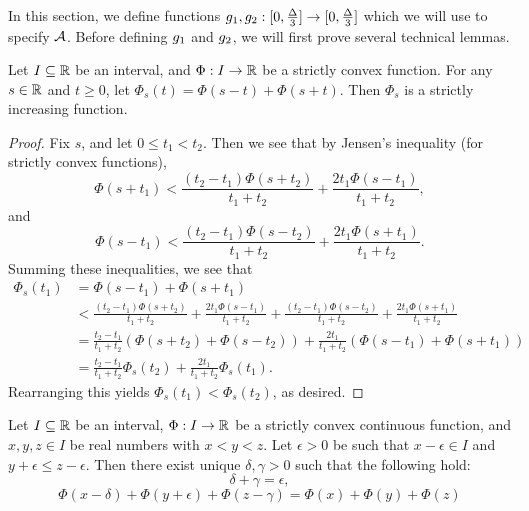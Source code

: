 In this section, we define functions $g_1, g_2: [0, \frac{\Delta}{3}] \to [0, \frac{\Delta}{3}]$ which we will use to specify $\mathcal{A}$. Before defining $g_1$ and $g_2$, we will first prove several technical lemmas.

\begin{lem}\label{lem:phi_s}
Let $I \subseteq \mathbb R$ be an interval, and $\Phi:I \to \mathbb R$ be a strictly convex function.  For any $s \in \mathbb R$ and $t \geq 0$, let $\Phi_s(t) = \Phi(s-t) + \Phi(s + t)$. Then $\Phi_s$ is a strictly increasing function.
\end{lem}

\begin{proof}
Fix $s$, and let $0 \leq t_1 < t_2$. Then we see that by Jensen's inequality (for strictly convex functions), $$\Phi(s + t_1) < \frac{(t_2-t_1)\Phi(s+t_2)}{t_1 + t_2} + \frac{2t_1\Phi(s-t_1)}{t_1 + t_2},$$ and $$\Phi(s - t_1) < \frac{(t_2-t_1)\Phi(s-t_2)}{t_1 + t_2} + \frac{2t_1\Phi(s+t_1)}{t_1 + t_2}.$$ Summing these inequalities, we see that 
\begin{equation*}
\begin{split}
\Phi_s(t_1) &= \Phi(s - t_1) + \Phi(s + t_1) \\
&< \frac{(t_2-t_1)\Phi(s+t_2)}{t_1 + t_2} + \frac{2t_1\Phi(s-t_1)}{t_1 + t_2} + \frac{(t_2-t_1)\Phi(s-t_2)}{t_1 + t_2} + \frac{2t_1\Phi(s+t_1)}{t_1 + t_2} \\
&= \frac{t_2 - t_1}{t_1 + t_2}(\Phi(s +t_2) + \Phi(s - t_2)) + \frac{2t_1}{t_1 + t_2}(\Phi(s - t_1) + \Phi(s + t_1)) \\
&= \frac{t_2 - t_1}{t_1 + t_2}\Phi_s(t_2) + \frac{2t_1}{t_1 + t_2}\Phi_s(t_1).
\end{split}
\end{equation*}
Rearranging this yields $\Phi_s(t_1) < \Phi_s(t_2)$, as desired.
\end{proof}

\begin{lem}\label{lem:lipschitz}
Let $I \subseteq \mathbb R$ be an interval, $\Phi:I \to \mathbb R$ be a strictly convex continuous function, and  $x, y, z \in I$ be real numbers with $x < y < z$. Let $\epsilon >0$ be such that $x - \epsilon \in I$ and $y + \epsilon \leq z - \epsilon$. Then there exist unique $\delta, \gamma >0$ such that the following hold: $$\delta + \gamma = \epsilon,$$ $$\Phi(x-\delta) + \Phi(y + \epsilon) + \Phi(z - \gamma) = \Phi(x) + \Phi(y) + \Phi(z)$$
\end{lem}

